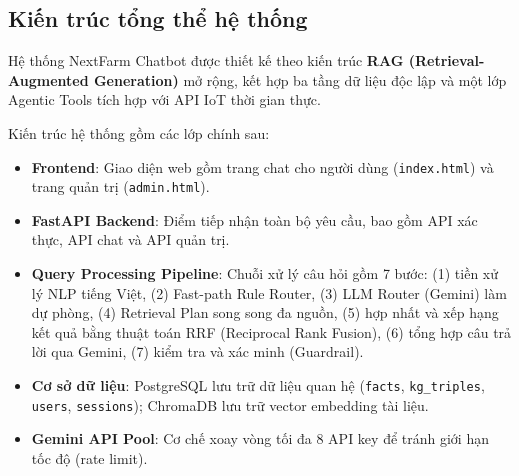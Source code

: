 \subsection{Kiến trúc tổng thể hệ thống}

Hệ thống NextFarm Chatbot được thiết kế theo kiến trúc \textbf{RAG (Retrieval-Augmented Generation)} mở rộng, kết hợp ba tầng dữ liệu độc lập và một lớp Agentic Tools tích hợp với API IoT thời gian thực.


\begin{sodo}[H]
    \centering
    \label{fig:kien-truc-tong-the}
\end{sodo}

Kiến trúc hệ thống gồm các lớp chính sau:

\begin{itemize}
    \item \textbf{Frontend}: Giao diện web gồm trang chat cho người dùng (\texttt{index.html}) và trang quản trị (\texttt{admin.html}).
    \item \textbf{FastAPI Backend}: Điểm tiếp nhận toàn bộ yêu cầu, bao gồm API xác thực, API chat và API quản trị.
    \item \textbf{Query Processing Pipeline}: Chuỗi xử lý câu hỏi gồm 7 bước: (1) tiền xử lý NLP tiếng Việt, (2) Fast-path Rule Router, (3) LLM Router (Gemini) làm dự phòng, (4) Retrieval Plan song song đa nguồn, (5) hợp nhất và xếp hạng kết quả bằng thuật toán RRF (Reciprocal Rank Fusion), (6) tổng hợp câu trả lời qua Gemini, (7) kiểm tra và xác minh (Guardrail).
    \item \textbf{Cơ sở dữ liệu}: PostgreSQL lưu trữ dữ liệu quan hệ (\texttt{facts}, \texttt{kg\_triples}, \texttt{users}, \texttt{sessions}); ChromaDB lưu trữ vector embedding tài liệu.
    \item \textbf{Gemini API Pool}: Cơ chế xoay vòng tối đa 8 API key để tránh giới hạn tốc độ (rate limit).
\end{itemize}

